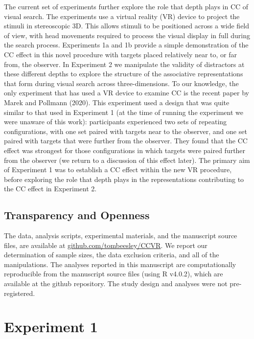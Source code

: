 \documentclass[
  english,
  man,floatsintext]{apa7}
\begin{document}
The current set of experiments further explore the role that depth plays in CC of visual search. The experiments use a virtual reality (VR) device to project the stimuli in stereoscopic 3D. This allows stimuli to be positioned across a wide field of view, with head movements required to process the visual display in full during the search process. Experiments 1a and 1b provide a simple demonstration of the CC effect in this novel procedure with targets placed relatively near to, or far from, the observer. In Experiment 2 we manipulate the validity of distractors at these different depths to explore the structure of the associative representations that form during visual search across three-dimensions. To our knowledge, the only experiment that has used a VR device to examine CC is the recent paper by Marek and Pollmann (2020). This experiment used a design that was quite similar to that used in Experiment 1 (at the time of running the experiment we were unaware of this work): participants experienced two sets of repeating configurations, with one set paired with targets near to the observer, and one set paired with targets that were further from the observer. They found that the CC effect was strongest for those configurations in which targets were paired further from the observer (we return to a discussion of this effect later). The primary aim of Experiment 1 was to establish a CC effect within the new VR procedure, before exploring the role that depth plays in the representations contributing to the CC effect in Experiment 2.

\hypertarget{transparency-and-openness}{%
\subsection{Transparency and Openness}\label{transparency-and-openness}}

The data, analysis scripts, experimental materials, and the manuscript source files, are available at \href{https://github.com/tombeesley/CCVR}{github.com/tombeesley/CCVR}. We report our determination of sample sizes, the data exclusion criteria, and all of the manipulations. The analyses reported in this manuscript are computationally reproducible from the manuscript source files (using R v4.0.2), which are available at the github repository. The study design and analyses were not pre-registered.

\hypertarget{experiment-1}{%
\section{Experiment 1}\label{experiment-1}}
\end{document}
